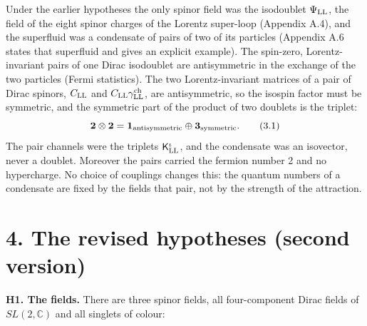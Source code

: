\documentclass[
  10pt,
]{article}
\begin{document}
Under the earlier hypotheses the only spinor field was the isodoublet
\(\Psi_{\rm LL}\), the field of the eight spinor charges of the Lorentz
super-loop (Appendix A.4), and the superfluid was a condensate of pairs
of two of its particles (Appendix A.6 states that superfluid and gives
an explicit example). The spin-zero, Lorentz-invariant pairs of one
Dirac isodoublet are antisymmetric in the exchange of the two particles
(Fermi statistics). The two Lorentz-invariant matrices of a pair of
Dirac spinors, \(C_{\rm LL}\) and
\(C_{\rm LL}\gamma^{\rm ch}_{\rm LL}\), are antisymmetric, so the
isospin factor must be symmetric, and the symmetric part of the product
of two doublets is the triplet:
\[\mathbf 2\otimes\mathbf 2=\mathbf 1_{\rm antisymmetric}\oplus\mathbf 3_{\rm symmetric}.\tag{3.1}\]
The pair channels were the triplets \(\mathsf K^\iota_{\rm LL}\), and
the condensate was an isovector, never a doublet. Moreover the pairs
carried the fermion number 2 and no hypercharge. No choice of couplings
changes this: the quantum numbers of a condensate are fixed by the
fields that pair, not by the strength of the attraction.

\hypertarget{the-revised-hypotheses-second-version}{%
\section{4. The revised hypotheses (second
version)}\label{the-revised-hypotheses-second-version}}

\textbf{H1. The fields.} There are three spinor fields, all
four-component Dirac fields of \(SL(2,\mathbb C)\) and all singlets of
colour:
\end{document}
